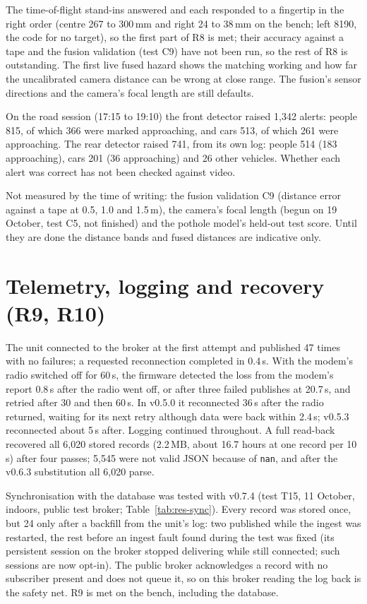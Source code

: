 The time-of-flight stand-ins answered and each responded to a fingertip in the right order (centre 267 to 300\,mm and right 24 to 38\,mm on the bench; left 8190, the code for no target), so the first part of R8 is met; their accuracy against a tape and the fusion validation (test C9) have not been run, so the rest of R8 is outstanding. The first live fused hazard shows the matching working and how far the uncalibrated camera distance can be wrong at close range. The fusion's sensor directions and the camera's focal length are still defaults.

On the road session (17:15 to 19:10) the front detector raised 1,342 alerts: people 815, of which 366 were marked approaching, and cars 513, of which 261 were approaching. The rear detector raised 741, from its own log: people 514 (183 approaching), cars 201 (36 approaching) and 26 other vehicles. Whether each alert was correct has not been checked against video.

Not measured by the time of writing: the fusion validation C9 (distance error against a tape at 0.5, 1.0 and 1.5\,m), the camera's focal length (begun on 19 October, test C5, not finished) and the pothole model's held-out test score. Until they are done the distance bands and fused distances are indicative only.

\section{Telemetry, logging and recovery (R9, R10)}
\label{sec:resx-telemetry}

The unit connected to the broker at the first attempt and published 47 times with no failures; a requested reconnection completed in 0.4\,s. With the modem's radio switched off for 60\,s, the firmware detected the loss from the modem's report 0.8\,s after the radio went off, or after three failed publishes at 20.7\,s, and retried after 30 and then 60\,s. In v0.5.0 it reconnected 36\,s after the radio returned, waiting for its next retry although data were back within 2.4\,s; v0.5.3 reconnected about 5\,s after. Logging continued throughout. A full read-back recovered all 6,020 stored records (2.2\,MB, about 16.7 hours at one record per 10\,s) after four passes; 5,545 were not valid JSON because of \texttt{nan}, and after the v0.6.3 substitution all 6,020 parse.

Synchronisation with the database was tested with v0.7.4 (test T15, 11 October, indoors, public test broker; Table~\ref{tab:res-sync}). Every record was stored once, but 24 only after a backfill from the unit's log: two published while the ingest was restarted, the rest before an ingest fault found during the test was fixed (its persistent session on the broker stopped delivering while still connected; such sessions are now opt-in). The public broker acknowledges a record with no subscriber present and does not queue it, so on this broker reading the log back is the safety net. R9 is met on the bench, including the database.

